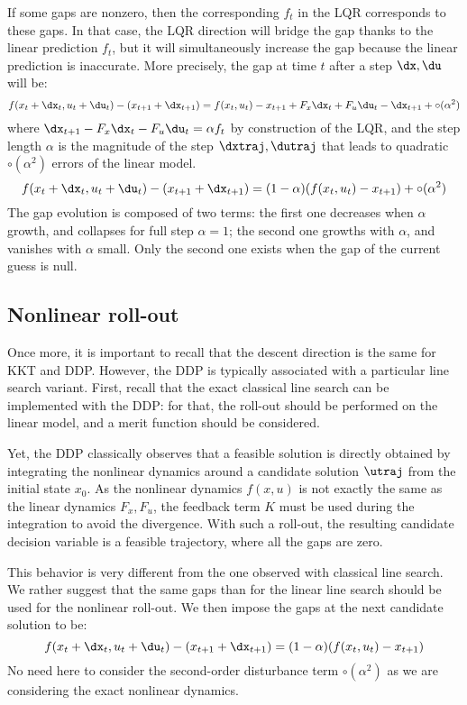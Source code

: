 \documentclass[10pt,a4paper]{article}
\begin{document}
If some gaps are nonzero, then the corresponding $f_t$ in the LQR corresponds to these gaps.
In that case, the LQR direction will bridge the gap thanks to the linear prediction $f_t$, but it will simultaneously increase the gap because the linear prediction is inaccurate.
More precisely, the gap at time $t$ after a step $\dx,\du$ will be:
$$
f(x_t+\dx_t,u_t+\du_t) - (x_{t+1}+\dx_{t+1})= f(x_t,u_t)-x_{t+1} + F_x \dx_t + F_u \du_t  -  \dx_{t+1} + \circ(\alpha^2)
$$
where $\dx_{t+1} - F_x \dx_t - F_u \du_t = \alpha f_t $ by construction of the LQR, and the step length $\alpha$ is the magnitude of the step $\dxtraj,\dutraj$ that leads to quadratic $\circ(\alpha^2)$ errors of the linear model.
$$
f(x_t+\dx_t,u_t+\du_t) - (x_{t+1}+\dx_{t+1}) = (1-\alpha) (f(x_t,u_t) - x_{t+1}) + \circ(\alpha^2)
$$
The gap evolution is composed of two terms: the first one decreases when $\alpha$ growth, and collapses for full step $\alpha=1$; the second one growths with $\alpha$, and vanishes with $\alpha$ small.
Only the second one exists when the gap of the current guess is null.

\subsection{Nonlinear roll-out}

Once more, it is important to recall that the descent direction is the same for KKT and DDP.
However, the DDP is typically associated with a particular line search variant.
First, recall that the exact classical line search can be implemented with the DDP: for that, the roll-out should be performed on the linear model, and a merit function should be considered.

Yet, the DDP classically observes that a feasible solution is directly obtained by integrating the nonlinear dynamics around a candidate solution $\utraj$ from the initial state $x_0$.
As the nonlinear dynamics $f(x,u)$ is not exactly the same as the linear dynamics $F_x,F_u$, the feedback term $K$ must be used during the integration to avoid the divergence.
With such a roll-out, the resulting candidate decision variable is a feasible trajectory, where all the gaps are zero.

This behavior is very different from the one observed with classical line search.
We rather suggest that the same gaps than for the linear line search should be used for the nonlinear roll-out.
We then impose the gaps at the next candidate solution to be:
$$
f(x_t+\dx_t,u_t+\du_t) - (x_{t+1}+\dx_{t+1}) = (1-\alpha) (f(x_t,u_t) - x_{t+1})
$$
No need here to consider the second-order disturbance term $\circ(\alpha^2)$ as we are considering the exact nonlinear dynamics.
\end{document}
